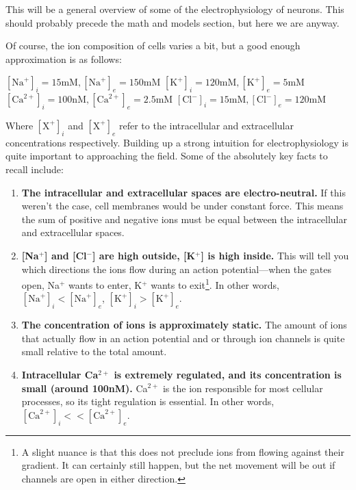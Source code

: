 \documentclass[12pt]{report}
\begin{document}
This will be a general overview of some of the electrophysiology of neurons. This should probably precede the math and models section, but here we are anyway.\newline

Of course, the ion composition of cells varies a bit, but a good enough approximation is as follows:\newline 


\hspace*{0.1in} $[\mathrm{Na}^+]_i = 15\mathrm{mM}, [\mathrm{Na}^+]_e = 150\mathrm{mM}$\newline
\hspace*{0.1in} $[\mathrm{K}^+]_i = 120\mathrm{mM}, [\mathrm{K}^+]_e = 5\mathrm{mM}$ \newline
\hspace*{0.1in} $[\mathrm{Ca}^{2+}]_i = 100\mathrm{nM}, 
[\mathrm{Ca}^{2+}]_e = 2.5\mathrm{mM}$\newline
\hspace*{0.1in} $[\mathrm{Cl}^-]_i = 15\mathrm{mM}, [\mathrm{Cl}^-]_e = 120\mathrm{mM}$ 
\newline

Where $[\mathrm{X}^+]_i$ and $[\mathrm{X}^+]_e$ refer to the intracellular and extracellular concentrations respectively. Building up a strong intuition for electrophysiology is quite important to approaching the field. Some of the absolutely key facts to recall include:

\begin{enumerate}
\item \textbf{The intracellular and extracellular spaces are electro-neutral.} If this weren't the case, cell membranes would be under constant force. This means the sum of positive and negative ions must be equal between the intracellular and extracellular spaces. 
\item \textbf{[Na$^+$] and [Cl$^-$] are high outside, [K$^+$] is high inside.} This will tell you which directions the ions flow during an action potential---when the gates open, Na$^+$ wants to enter, K$^+$ wants to exit\footnote{A slight nuance is that this does not preclude ions from flowing against their gradient. It can certainly still happen, but the net movement will be out if channels are open in either direction.}. In other words, $[\mathrm{Na}^+]_i < [\mathrm{Na}^+]_e$, $[\mathrm{K}^+]_i > [\mathrm{K}^+]_e$.  
\item \textbf{The concentration of ions is approximately static.} The amount of ions that actually flow in an action potential and or through ion channels is quite small relative to the total amount.
\item \textbf{Intracellular Ca$^{2+}$ is extremely regulated, and its concentration is small (around 100nM).} Ca$^{2+}$ is the ion responsible for most cellular processes, so its tight regulation is essential. In other words, $[\mathrm{Ca}^{2+}]_i << [\mathrm{Ca}^{2+}]_e$. 
\end{enumerate}
\end{document}
